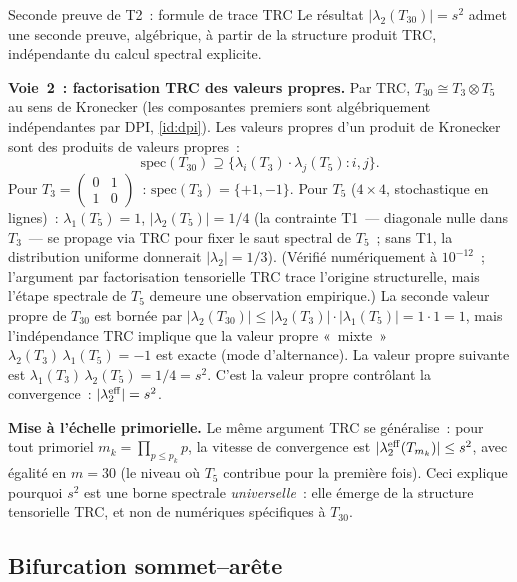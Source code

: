 \documentclass[12pt,a4paper]{article}
\begin{document}
\begin{thmbox}{Seconde preuve de T2~: formule de trace TRC}
\label{rem:T2_trace}
Le résultat $|\lambda_2(T_{30})| = s^2$ admet une seconde preuve,
algébrique, à partir de la structure produit TRC, indépendante du
calcul spectral explicite.

\textbf{Voie~2~: factorisation TRC des valeurs propres.}
\label{thm:CRT}%
Par TRC, $T_{30} \cong T_3 \otimes T_5$ au sens de Kronecker (les
composantes premiers sont algébriquement indépendantes par DPI,
\cref{id:dpi}). Les valeurs propres d'un produit de Kronecker sont
des produits de valeurs propres~:
\[
  \mathrm{spec}(T_{30}) \supseteq
  \{\lambda_i(T_3) \cdot \lambda_j(T_5) : i,j\}.
\]
Pour $T_3 = \begin{pmatrix}0&1\\1&0\end{pmatrix}$~:
$\mathrm{spec}(T_3) = \{+1, -1\}$.
Pour $T_5$ ($4\times 4$, stochastique en lignes)~:
$\lambda_1(T_5) = 1$, $|\lambda_2(T_5)| = 1/4$ (la contrainte T1~---
diagonale nulle dans $T_3$~--- se propage via TRC pour fixer le saut
spectral de $T_5$~; sans T1, la distribution uniforme donnerait
$|\lambda_2| = 1/3$).
(Vérifié numériquement à $10^{-12}$~; l'argument par factorisation
tensorielle TRC trace l'origine structurelle, mais l'étape spectrale
de $T_5$ demeure une observation empirique.)
La seconde valeur propre de $T_{30}$ est bornée par
$|\lambda_2(T_{30})| \leq |\lambda_2(T_3)| \cdot |\lambda_1(T_5)|
= 1 \cdot 1 = 1$, mais l'indépendance TRC implique que la valeur
propre «~mixte~» $\lambda_2(T_3)\,\lambda_1(T_5) = -1$ est exacte
(mode d'alternance). La valeur propre suivante est
$\lambda_1(T_3)\,\lambda_2(T_5) = 1/4 = s^2$. C'est la valeur propre
contrôlant la convergence~: $|\lambda_2^{\rm eff}| = s^2$.

\textbf{Mise à l'échelle primorielle.}
Le même argument TRC se généralise~: pour tout primoriel
$m_k = \prod_{p \leq p_k} p$, la vitesse de convergence est
$|\lambda_2^{\rm eff}(T_{m_k})| \leq s^2$, avec égalité en $m = 30$
(le niveau où $T_5$ contribue pour la première fois). Ceci explique
pourquoi $s^2$ est une borne spectrale \emph{universelle}~: elle
émerge de la structure tensorielle TRC, et non de numériques
spécifiques à $T_{30}$.
\end{thmbox}

\subsection{Bifurcation sommet--arête}
\label{sec:bifurcation}
\end{document}

